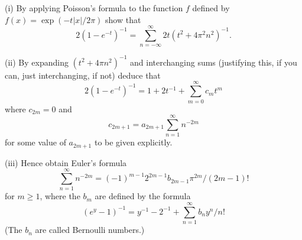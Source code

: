 \begin{question} (i) By applying Poisson's formula to the function
$f$ defined by $f(x)=\exp(-t|x|/2\pi)$ show that
\[2(1-e^{-t})^{-1}
=\sum_{n=-\infty}^{\infty}2t(t^{2}+4\pi^{2}n^{2})^{-1}.\]

(ii) By expanding $(t^{2}+4\pi n^{2})^{-1}$ and
interchanging sums (justifying this, if you can, just interchanging,
if not) deduce that
\[2(1-e^{-t})^{-1}=1+2t^{-1}+\sum_{m=0}^{\infty}c_{m}t^{m}\]
where $c_{2m}=0$ and
\[c_{2m+1}=a_{2m+1}\sum_{n=1}^{\infty}n^{-2m}\]
for some value of $a_{2m+1}$ to be given explicitly.

(iii) Hence obtain Euler's formula
\[\sum_{n=1}^{\infty}n^{-2m}=
(-1)^{m-1}2^{2m-1}b_{2m-1}\pi^{2m}/(2m-1)!\]
for $m\geq 1$, where the $b_{m}$ are defined by the formula
\[(e^{y}-1)^{-1}=y^{-1}-2^{-1}+\sum_{n=1}^{\infty}b_{n}y^{n}/n!\]
(The $b_{n}$ are called Bernoulli numbers.)
\end{question}
